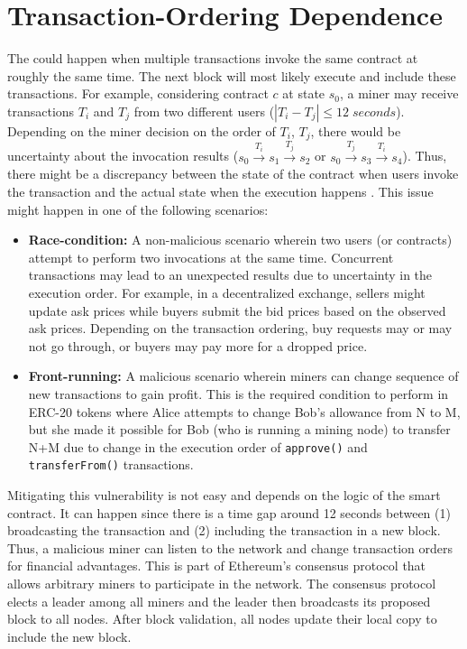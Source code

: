 \section{Transaction-Ordering Dependence}
The \mwa could happen when multiple transactions invoke the same contract at roughly the same time. The next block will most likely execute and include these transactions. For example, considering contract $c$ at state $s_0$, a miner may receive transactions $T_i$ and $T_j$ from two different users ($|T_i-T_j| \leq 12 \; seconds$). Depending on the miner decision on the order of $T_i$, $T_j$, there would be uncertainty about the invocation results (\ie $s_0 \xrightarrow{T_i} s_1 \xrightarrow{T_j} s_2$ or $s_0 \xrightarrow{T_j} s_3 \xrightarrow{T_i} s_4$). Thus, there might be a discrepancy between the state of the contract when users invoke the transaction and the actual state when the execution happens \cite{SmartContractSecurity}. This issue might happen in one of the following scenarios:
\begin{itemize}
	\item \textbf{Race-condition:} A non-malicious scenario wherein two users (or contracts) attempt to perform two invocations at the same time. Concurrent transactions may lead to an unexpected results due to uncertainty in the execution order. For example, in a decentralized exchange, sellers might update ask prices while buyers submit the bid prices based on the observed ask prices. Depending on the transaction ordering, buy requests may or may not go through, or buyers may pay more for a dropped price.
	
	\item \textbf{Front-running:} A malicious scenario wherein miners can change sequence of new transactions to gain profit. This is the required condition to perform \mwa in ERC-20 tokens where Alice attempts to change Bob’s allowance from N to M, but she made it possible for Bob (who is running a mining node) to transfer N+M due to change in the execution order of \texttt{approve()} and \texttt{transferFrom()} transactions.
\end{itemize}
Mitigating this vulnerability is not easy and depends on the logic of the smart contract. It can happen since there is a time gap around 12 seconds between (1) broadcasting the transaction and (2) including the transaction in a new block. Thus, a malicious miner can listen to the network and change transaction orders for financial advantages. This is part of Ethereum's consensus protocol that allows arbitrary miners to participate in the network. The consensus protocol elects a leader among all miners and the leader then broadcasts its proposed block to all nodes. After block validation, all nodes update their local copy to include the new block.


